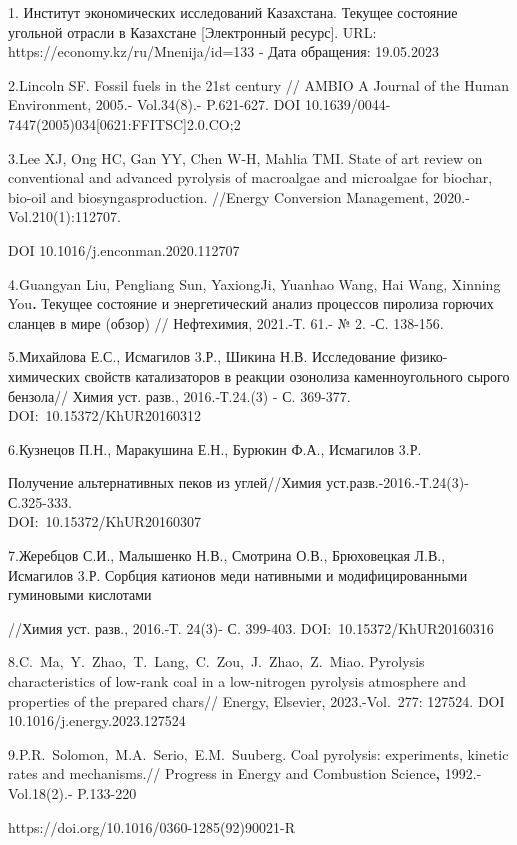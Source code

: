 \begin{noparindent}
1. Институт экономических исследований Казахстана. Текущее состояние
угольной отрасли в Казахстане {[}Электронный ресурс{]}. URL:
https://economy.kz/ru/Mnenija/id=133 - Дата обращения: 19.05.2023

2.Lincoln SF. Fossil fuels in the 21st century // AMBIO A Journal of the
Human Environment, 2005.- Vol.34(8).- P.621-627. DOI
10.1639/0044-7447(2005)034{[}0621:FFITSC{]}2.0.CO;2

3.Lee XJ, Ong HC, Gan YY, Chen W-H, Mahlia TMI. State of art review on
conventional and advanced pyrolysis of macroalgae and microalgae for
biochar, bio-oil and biosyngasproduction. //Energy Conversion
Management, 2020.-Vol.210(1):112707.

DOI 10.1016/j.enconman.2020.112707

4.Guangyan Liu, Pengliang Sun, YaxiongJi, Yuanhao Wang, Hai Wang,
Xinning You{\bfseries .} Текущее состояние и энергетический анализ
процессов пиролиза горючих сланцев в мире (обзор) // Нефтехимия,
2021.-Т. 61.- № 2. -С. 138-156.

5.Михайлова Е.С., Исмагилов 3.Р., Шикина Н.В. Исследование
физико-химических свойств катализаторов в реакции озонолиза
каменноугольного сырого бензола// Химия уст. разв., 2016.-Т.24.(3) - С.
369-377. DOI:~10.15372/KhUR20160312

6.Кузнецов П.Н., Маракушина Е.Н., Бурюкин Ф.А., Исмагилов 3.Р.

Получение альтернативных пеков из углей//Химия уст.разв.-2016.-Т.24(3)-
С.325-333.\\
DOI:~10.15372/KhUR20160307

7.Жеребцов С.И., Малышенко Н.В., Смотрина О.В., Брюховецкая Л.В.,
Исмагилов 3.Р. Сорбция катионов меди нативными и модифицированными
гуминовыми кислотами

//Химия уст. разв., 2016.-Т. 24(3)- С. 399-403.
DOI:~10.15372/KhUR20160316

8.C.~Ma,~Y.~Zhao,~T.~Lang,~C.~Zou,~J.~Zhao,~Z.~Miao. Pyrolysis
characteristics of low-rank coal in a low-nitrogen pyrolysis atmosphere
and properties of the prepared chars// Energy, Elsevier, 2023.-Vol.~277:
127524. DOI 10.1016/j.energy.2023.127524

9.P.R.~Solomon,~M.A.~Serio,~E.M.~Suuberg. Coal pyrolysis: experiments,
kinetic rates and mechanisms.// Progress in Energy and Combustion
Science{\bfseries ,} 1992.-Vol.18(2).- P.133-220

https://doi.org/10.1016/0360-1285(92)90021-R


\end{noparindent}
